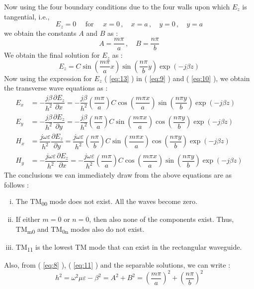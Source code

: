 \documentclass[12pt]{article}
\newcommand*{\myref}[1]{%
  \begingroup
    \hypersetup{
      linkcolor=linkequation,
      linkbordercolor=linkequation,
    }%
    \ref{#1}%
  \endgroup
}
\begin{document}
Now using the four boundary conditions due to the four walls upon which $E_z$ is tangential, i.e.,
\begin{equation*}
  E_z = 0 \quad \text{ for } \quad x=0\, , \quad x=a \, , \quad y=0 \, , \quad y=a
\end{equation*}
we obtain the constants $A$ and $B$ as :
\begin{equation}
  A=\dfrac{m\pi}{a} \, , \quad B=\dfrac{n\pi}{b} \label{eq:12}
\end{equation}
We obtain the final solution for $E_z$ as :
\begin{equation}
  E_z = C \sin\left( \dfrac{m\pi}{a}x \right)\sin\left( \dfrac{n\pi}{b}y \right)\exp\left( -j\beta z \right) \label{eq:13}
\end{equation}
Now using the expression for $E_z$ (\myref{eq:13}) in (\myref{eq:9}) and (\myref{eq:10}), we obtain the transverse wave equations as :
\begin{align}
  E_x &= -\dfrac{j \beta}{h^2}\dfrac{\partial E_z}{\partial x} = -\dfrac{j \beta}{h^2}\left( \dfrac{m\pi}{a} \right) C \cos \left( \dfrac{m \pi x}{a} \right) \sin\left( \dfrac{n\pi y}{b} \right) \exp(-j\beta z) \label{eq:14} \\
  E_y &= -\dfrac{j \beta}{h^2}\dfrac{\partial E_z}{\partial y} = -\dfrac{j \beta}{h^2} \left( \dfrac{n\pi}{a} \right) C \sin\left( \dfrac{m\pi x}{a} \right)\cos\left( \dfrac{n\pi y}{b} \right) \exp(-j\beta z) \label{eq:15} \\
  H_x &= \dfrac{j\omega \varepsilon}{h^2} \dfrac{\partial E_z}{\partial y} = \dfrac{j \omega \varepsilon}{h^2}\left( \dfrac{n\pi}{b} \right) C\sin\left( \dfrac{m\pi x}{a} \right) \cos\left( \dfrac{n\pi y}{b} \right)\exp(-j\beta z) \label{eq:16} \\
  H_y &= -\dfrac{j\omega \varepsilon}{h^2} \dfrac{\partial E_z}{\partial x} = -\dfrac{j \omega \varepsilon}{h^2} \left( \dfrac{m\pi}{a} \right)C \cos\left( \dfrac{m\pi x}{a} \right)\sin\left( \dfrac{n\pi y}{b} \right) \exp(-j\beta z) \label{eq:17}
\end{align}
The conclusions we can immediately draw from the above equations are as follows :
\begin{enumerate}[i.)]
  \item The TM\textsubscript{00} mode does not exist. All the waves become zero. 
  \item If either $m=0$ or $n=0$, then also none of the components exist. Thus, TM\textsubscript{m0} and TM\textsubscript{0n} modes also do not exist.
  \item TM\textsubscript{11} is the lowest TM mode that can exist in the rectangular waveguide.
\end{enumerate}
Also, from (\myref{eq:8}), (\myref{eq:11}) and the separable solutions, we can write :
\begin{equation}
  h^2=\omega^2 \mu \varepsilon -\beta^2 = A^2+B^2 = \left( \dfrac{m\pi}{a} \right)^2 + \left( \dfrac{n \pi}{b} \right)^2 \label{eq:18}
\end{equation}
\end{document}
